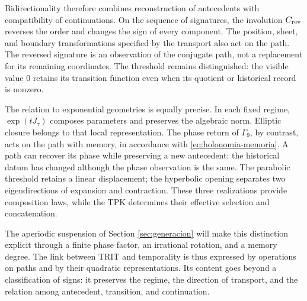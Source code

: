 Bidirectionality therefore combines reconstruction of antecedents
with compatibility of continuations. On the sequence of signatures, the
involution \(C_{\rm rev}\) reverses the order and changes the sign of every
component. The position, sheet, and boundary transformations specified by
the transport also act on the path. The reversed signature is an observation
of the conjugate path, not a replacement for its remaining coordinates.
The threshold remains distinguished: the visible value \(0\) retains its
transition function even when its quotient or historical record is nonzero.

The relation to exponential geometries is equally precise. In
each fixed regime, \(\exp(tJ_\tau)\) composes parameters and preserves the
algebraic norm. Elliptic closure belongs to that local representation.
The phase return of \(\Gamma_9\), by contrast, acts on the path
with memory, in accordance with \eqref{eq:holonomia-memoria}. A path can
recover its phase while preserving a new antecedent: the historical datum has
changed although the phase observation is the same. The parabolic threshold
retains a linear displacement; the hyperbolic opening separates two
eigendirections of expansion and contraction. These three realizations
provide composition laws, while the TPK determines their effective
selection and concatenation.

The aperiodic suspension of Section \ref{sec:generacion} will make
this distinction explicit through a finite phase factor, an irrational rotation,
and a memory degree. The link between TRIT and temporality is thus
expressed by operations on paths and by their quadratic
representations. Its content goes beyond a classification of signs: it preserves the
regime, the direction of transport, and the relation among antecedent,
transition, and continuation.
